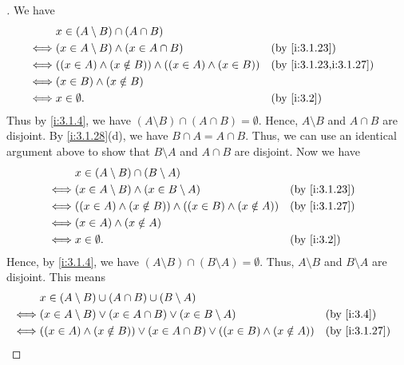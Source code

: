 \begin{proof}[]
  We have
  \begin{align*}
         & x \in (A \setminus B) \cap (A \cap B)                                                        \\
    \iff & (x \in A \setminus B) \land (x \in A \cap B)                     &  & \by{i:3.1.23}          \\
    \iff & ((x \in A) \land (x \notin B)) \land ((x \in A) \land (x \in B)) &  & \by{i:3.1.23,i:3.1.27} \\
    \iff & (x \in B) \land (x \notin B)                                                                 \\
    \iff & x \in \emptyset.                                                 &  & \by{i:3.2}
  \end{align*}
  Thus by \cref{i:3.1.4}, we have \((A \setminus B) \cap (A \cap B) = \emptyset\).
  Hence, \(A \setminus B\) and \(A \cap B\) are disjoint.
  By \cref{i:3.1.28}(d), we have \(B \cap A = A \cap B\).
  Thus, we can use an identical argument above to show that \(B \setminus A\) and \(A \cap B\) are disjoint.
  Now we have
  \begin{align*}
         & x \in (A \setminus B) \cap (B \setminus A)                                             \\
    \iff & (x \in A \setminus B) \land (x \in B \setminus A)                   &  & \by{i:3.1.23} \\
    \iff & ((x \in A) \land (x \notin B)) \land ((x \in B) \land (x \notin A)) &  & \by{i:3.1.27} \\
    \iff & (x \in A) \land (x \notin A)                                                           \\
    \iff & x \in \emptyset.                                                    &  & \by{i:3.2}
  \end{align*}
  Hence, by \cref{i:3.1.4}, we have \((A \setminus B) \cap (B \setminus A) = \emptyset\).
  Thus, \(A \setminus B\) and \(B \setminus A\) are disjoint.
  This means
  \begin{align*}
         & x \in (A \setminus B) \cup (A \cap B) \cup (B \setminus A)                                                             \\
    \iff & (x \in A \setminus B) \lor (x \in A \cap B) \lor (x \in B \setminus A)                              &  & \by{i:3.4}    \\
    \iff & ((x \in A) \land (x \notin B)) \lor (x \in A \cap B) \lor ((x \in B) \land (x \notin A))            &  & \by{i:3.1.27} \\

\end{align*}
\end{proof}
